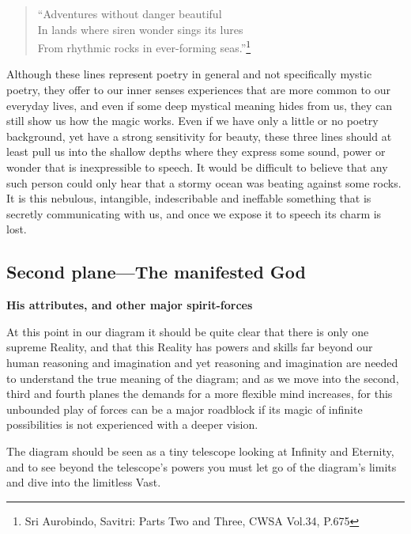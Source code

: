 \documentclass[12pt,a4paper]{book}
\begin{document}
\begin{verse}
``Adventures without danger beautiful\\
In lands where siren wonder sings its lures\\
From rhythmic rocks in ever-forming seas.''\footnote{Sri Aurobindo, Savitri: Parts Two and Three, CWSA Vol.34, P.675}
\end{verse}

Although these lines represent poetry in general and not specifically
mystic poetry, they offer to our inner senses experiences that are
more common to our everyday lives, and even if some deep mystical
meaning hides from us, they can still show us how the magic
works. Even if we have only a little or no poetry background, yet have
a strong sensitivity for beauty, these three lines should at least
pull us into the shallow depths where they express some sound, power
or wonder that is inexpressible to speech. It would be difficult to
believe that any such person could only hear that a stormy ocean was
beating against some rocks. It is this nebulous, intangible,
indescribable and ineffable something that is secretly communicating
with us, and once we expose it to speech its charm is lost.


\newpage
\begin{center}\section*{Second plane---The manifested God}\end{center}

\begin{center}{\bf His attributes, and other major spirit-forces}\end{center}



At this point in our diagram it should be quite clear that there is
only one supreme Reality, and that this Reality has powers and skills
far beyond our human reasoning and imagination and yet reasoning and
imagination are needed to understand the true meaning of the diagram;
and as we move into the second, third and fourth planes the demands
for a more flexible mind increases, for this unbounded play of forces
can be a major roadblock if its magic of infinite possibilities is not
experienced with a deeper vision.

The diagram should be seen as a tiny telescope looking at Infinity and
Eternity, and to see beyond the telescope's powers you must let go of
the diagram's limits and dive into the limitless Vast.
\end{document}
